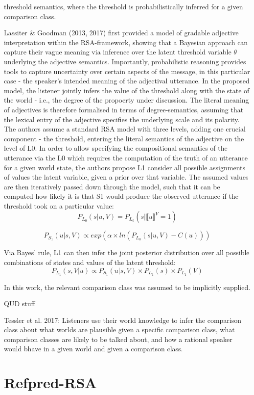 threshold semantics, where the threshold is probabilistically inferred \parencite{lassiter2017adjectival} for a given comparison class.

Lassiter \& Goodman (2013, 2017) first provided a model of gradable adjective interpretation within the RSA-framework, showing that a Bayesian approach can capture their vague meaning via inference over the latent threshold variable $\theta$ underlying the adjective semantics. Importantly, probabilistic reasoning provides tools to capture uncertainty over certain aspects of the message, in this particular case - the speaker’s intended meaning of the adjectival utterance.  
In the proposed model, the listener jointly infers the value of the threshold along with the state of the world - i.e., the degree of the propoerty under discussion. The literal meaning of adjectives is therefore formalised in terms of degree-semantics, assuming that the lexical entry of the adjective specifies the underlying scale and its polarity. 
The authors assume a standard RSA model with three levels, adding one crucial component - the threshold, entering the literal semantics of the adjective on the level of L0. 
In order to allow specifying the compositional semantics of the utterance via the L0 which requires the computation of the truth of an utterance for a given world state, the authors propose L1 consider all possible assignments of values the latent variable, given a prior over that variable. The assumed values are then iteratively passed down through the model, such that it can be computed how likely it is that S1 would produce the observed utterance if the threshold took on a particular value:
$$P_{L_0} (s | u, V) = P_{L_0} (s | \llbracket u \rrbracket ^V = 1 )$$

$$P_{S_1} (u | s, V) \propto exp(\alpha \times ln (P_{L_0} (s | u, V) - C(u)) )$$

Via Bayes' rule, L1 can then infer the joint posterior distribution over all possible combinations of states and values of the latent threshold:
$$P_{L_1} (s, V | u) \propto P_{S_1} (u | s, V) \times P_{L_1} (s) \times P_{L_1}(V)$$

In this work, the relevant comparison class was assumed to be implicitly supplied. 

QUD stuff

Tessler et al. 2017: 
Listeners use their world knowledge to infer the comparison class about what worlds are plausible given a specific comparison class, what comparison classes are likely to be talked about, and how a rational speaker would bhave in a given world and given a comparison class. 


\section{Refpred-RSA}
